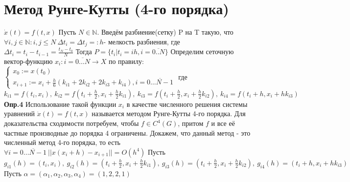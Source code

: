 \documentclass[a4paper,14pt]{article}
\begin{document}
\section{Метод Рунге-Кутты (4-го порядка)}
$\dot{x}(t)=f(t,x)$\newline
\indent Пусть $N\in \mathbb{N}$. Введём разбиение(сетку) P на T такую, что $\forall i,j \in \mathbb{N}:i,j\leq N \ \Delta t_i=\Delta t_j =:h$- мелкость разбиения,
где $\Delta t_i=t_i-t_{i-1}=\frac{t_N-t_0}{N}$\newline
Тогда $P=\{t_i|t_i=ih,i=\overline{0..N}\}$\newline
Определим сеточную вектор-функцию $x_i:i=\overline{0...N}\rightarrow X$ по правилу:\newline
$
\begin{cases}
  x_0:=x(t_0) \\
  x_{i+1}:=x_i+\frac{h}{6}(k_{i1}+2k_{i2}+2k_{i3}+k_{i4}), i=\overline{0...N-1}
\end{cases}
$\newline
где $k_{i1}=f(t_i,x_i),\ k_{i2}=f(t_i+\frac{h}{2},x_i+\frac{h}{2}k_{i1}),\ k_{i3}=f(t_i+\frac{h}{2},x_i+\frac{h}{2}k_{i2}),\ k_{i4}=f(t_i+h,x_i+hk_{i3})$\newline
\textbf{Опр.4} Использование такой функции $x_i$ в качестве численного решения системы уравнений\newline
$\dot{x}(t)=f(t,x)$ называется методом Рунге-Кутты 4-го порядка.\newline
Для доказательства сходимости потребуем, чтобы $f \in C^4(G)$, притом $f$ и все её частные производные до порядка 4 ограничены.\newline
Докажем, что данный метод - это численный метод 4-го порядка,\newline
то есть $\forall i=\overline{0...N-1}\ ||x(x_i+h)-x_{i+1}||=O(h^4)$\newline
Пусть $g_{i1}(h)=(t_i,x_i),\ g_{i2}(h)=(t_i+\frac{h}{2},x_i+\frac{h}{2}k_{i1}),\ g_{i3}(h)=(t_i+\frac{h}{2},x_i+\frac{h}{2}k_{i2}),\ g_{i4}(h)=(t_i+h,x_i+hk_{i3})$\newline
Пусть $\alpha=(\alpha_1,\alpha_2,\alpha_3,\alpha_4)=(1,2,2,1)$\newline
\end{document}
